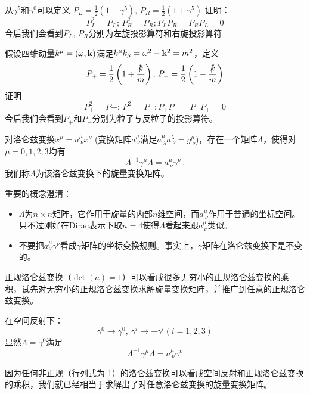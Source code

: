 \documentclass[CJK]{beamer}
\begin{document}
\begin{frame}
\bch
从$\gamma^5$和$\gamma^0$可以定义
$P_L = \frac{1}{2}\left(1-\gamma^5\right),\, P_R = \frac{1}{2}\left(1+\gamma^5\right)$
证明：
$$P_L^2 = P_L;\, P_R^2 = P_R; P_LP_R = P_R P_L=0$$
今后我们会看到$P_L$, $P_R$分别为左旋投影算符和右旋投影算符

\skipline
假设四维动量$k^\mu = (\omega, {\mathbf{k}})$满足$k^\mu k_\mu = \omega^2 - {\mathbf{k}}^2 = m^2$，定义
$$P_+ = \frac{1}{2}\left(1+ \frac{\slashed{k}}{m}\right),\, P_- = \frac{1}{2}\left(1- \frac{\slashed{k}}{m}\right)$$
证明
$$P_+^2 = P+;\, P_-^2 = P_-; P_+P_- = P_-P_+ = 0$$
今后我们会看到$P_+$和$P_-$分别为粒子与反粒子的投影算符。
\ech
\end{frame}

\begin{frame}
\bch
对洛仑兹变换$x^\mu = a^\mu_{\ \nu}x^\nu$ (变换矩阵$a^\mu_{\ \nu}$满足$a^\mu_{\ \lambda} a^\lambda_{\ \nu} = g^\mu_{\ \nu}$)，存在一个矩阵$\Lambda$，使得对$\mu=0,1,2,3$均有
$$\Lambda^{-1}\gamma^\mu\Lambda = a^\mu_{\ \nu} \gamma^\nu\, .$$
我们称$\Lambda$为该洛仑兹变换下的旋量变换矩阵。

\skipline
重要的概念澄清：
\begin{itemize}
\item{$\Lambda$为$n\times n$矩阵，它作用于旋量的内部$n$维空间，而$a^\mu_{\ \nu}$作用于普通的坐标空间。只不过刚好在Dirac表示下取$n=4$使得$\Lambda$看起来跟$a^\mu_{\ \nu}$类似。}
\item{不要把$a^\mu_\nu\gamma^\nu$看成$\gamma$矩阵的坐标变换规则。事实上，$\gamma$矩阵在洛仑兹变换下是不变的。}
\end{itemize}


\skipline
正规洛仑兹变换（$\det(a) = 1$）可以看成很多无穷小的正规洛仑兹变换的乘积，试先对无穷小的正规洛仑兹变换求解旋量变换矩阵，并推广到任意的正规洛仑兹变换。

\ech
\end{frame}



\begin{frame}
\bch
在空间反射下：
$$\gamma^0 \rightarrow \gamma^0,\  \gamma^i\rightarrow -\gamma^i (i=1,2,3)$$
显然$\Lambda = \gamma^0$满足
$$\Lambda^{-1}\gamma^\mu \Lambda = a^\mu_{\ \nu}\gamma^\nu$$



\skipline

因为任何非正规（行列式为-1）的洛仑兹变换可以看成空间反射和正规洛仑兹变换的乘积，我们就已经相当于求解出了对任意洛仑兹变换的旋量变换矩阵。

\ech

\end{frame}
\end{document}
